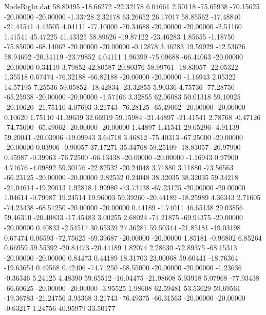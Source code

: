 \begin{filecontents}{NodeRight.dat}
  58.80495  -18.66272  -22.32178     6.04661    2.50118  -75.65938  -70.15625  -20.00000  -20.00000   -1.33728    2.32178   63.26652   26.17017
  58.85562  -17.48840  -21.41541     4.43505    4.04111  -77.10000  -70.34688  -20.00000  -20.00000   -2.51160    1.41541   45.47225   41.43325
  58.89626  -19.87122  -23.46283     1.85655   -1.18750  -75.85000  -68.14062  -20.00000  -20.00000   -0.12878    3.46283   19.59929  -12.53626
  58.94692  -20.34119  -23.79852     4.04111    1.96399  -75.09688  -66.44063  -20.00000  -20.00000    0.34119    3.79852   42.80587   20.80376
  58.99761  -18.83057  -22.05322     1.35518    0.67474  -76.32188  -66.82188  -20.00000  -20.00000   -1.16943    2.05322   14.57195    7.25536
  59.05852  -18.42834  -23.32855     5.90336    4.75736  -77.28750  -65.25938  -20.00000  -20.00000   -1.57166    3.32855   62.06083   50.01318
  59.10925  -20.10620  -21.75110     4.07693    3.21743  -76.28125  -65.49062  -20.00000  -20.00000    0.10620    1.75110   41.39639   32.66919
  59.15984  -21.44897  -21.41541     2.78768   -0.47126  -74.75000  -65.49062  -20.00000  -20.00000    1.44897    1.41541   29.05296   -4.91139
  59.20041  -20.03906  -19.09943     3.64718    3.46812  -75.40313  -67.25000  -20.00000  -20.00000    0.03906   -0.90057   37.17271   35.34768
  59.25109  -18.83057  -20.97900     0.45987   -0.39963  -76.72500  -66.13438  -20.00000  -20.00000   -1.16943    0.97900    4.71676   -4.09892
  59.30176  -22.82532  -20.24048     3.71880    3.71880  -73.56563  -66.23125  -20.00000  -20.00000    2.82532    0.24048   38.32035   38.32035
  59.34218  -21.04614  -19.20013     1.92818    1.99980  -73.73438  -67.23125  -20.00000  -20.00000    1.04614   -0.79987   19.24514   19.96003
  59.39260  -20.44189  -18.25989     4.36343    2.71605  -74.23438  -68.51250  -20.00000  -20.00000    0.44189   -1.74011   46.65138   29.03856
  59.46310  -20.40833  -17.45483     3.00255    2.68024  -74.21875  -69.94375  -20.00000  -20.00000    0.40833   -2.54517   30.65339   27.36287
  59.50344  -21.85181  -19.03198     0.67474    0.06593  -72.75625  -69.39687  -20.00000  -20.00000    1.85181   -0.96802    6.85264    0.66959
  59.55392  -20.84473  -20.44189     1.82074    2.28630  -72.89375  -68.15313  -20.00000  -20.00000    0.84473    0.44189   18.31703   23.00068
  59.60441  -18.76364  -19.63654     0.49568    0.42406  -74.71250  -68.55000  -20.00000  -20.00000   -1.23636   -0.36346    5.24125    4.48390
  59.65512  -16.04475  -21.98608     5.93918    5.07968  -77.93438  -66.60625  -20.00000  -20.00000   -3.95525    1.98608   62.59481   53.53629
  59.69561  -19.36783  -21.24756     3.93368    3.21743  -76.49375  -66.31563  -20.00000  -20.00000   -0.63217    1.24756   40.95979   33.50177

\end{filecontents}
